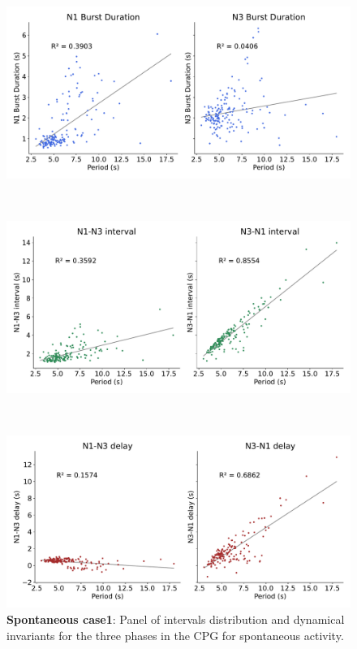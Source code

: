 \begin{figure}[htbp]
\begin{minipage}[b]{0.53\textwidth}
		\centering
		\begin{minipage}[b]{\textwidth}
			\centering
			\includegraphics[width=\textwidth]{./invariants/data/SUSSEX/prep1/images/spontaneous_2phases_durations.pdf}
		\end{minipage}\\
		\begin{minipage}[b]{\textwidth}
			\centering
			\includegraphics[width=\textwidth]{./invariants/data/SUSSEX/prep1/images/spontaneous_2phases_intervals.pdf}
		\end{minipage}\\
		\begin{minipage}[b]{\textwidth}
			\centering
			\includegraphics[width=\textwidth]{./invariants/data/SUSSEX/prep1/images/spontaneous_2phases_delays.pdf}
		\end{minipage}
	\end{minipage}
	\caption{\textbf{Spontaneous case1}: Panel of intervals distribution and dynamical invariants for the three phases in the CPG for spontaneous activity.}
	\label{fig:prep1 2 phases invariants}
\end{figure}
